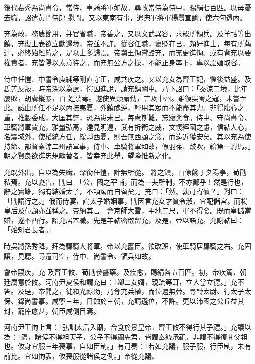 \begin{pinyinscope}
 後代裴秀為尚書令，常侍、車騎將軍如故。尋改常侍為侍中，賜絹七百匹。以母憂去職，詔遣黃門侍郎
 慰問。又以東南有事，遣典軍將軍楊囂宣諭，使六旬還內。



 充為政，務農節用，并官省職，帝善之，又以文武異容，求罷所領兵。及羊祜等出鎮，充復上表欲立勳邊境，帝並不許。從容任職，褒貶在已，頗好進士，每有所薦達，必終始經緯之，是以士多歸焉。帝舅王恂嘗毀充，而充更進恂。或有背充以要權貴者，充皆陽以素意待之。而充無公方之操，不能正身率下，專以諂媚取容。



 侍中任愷、中書令庾純等剛直守正，咸共疾之。又以充女為齊王妃，懼後益盛。及氐羌反叛，時帝深以為慮，愷因進說，請充鎮關中。乃下詔曰：「秦涼二境，比年屢敗，胡虜縱暴，百
 姓荼毒。遂使異類扇動，害及中州。雖復吳蜀之寇，未嘗至此。誠由所任不足以內撫夷夏，外鎮醜逆，輕用其眾而不能盡其力。非得腹心之重，推轂委成，大匡其弊，恐為患未已。每慮斯難，忘寢與食。侍中、守尚書令、車騎將軍賈充，雅量弘高，達見明遠，武有折衝之威，文懷經國之慮，信結人心，名震域外。使權統方任，綏靜西夏，則吾無西顧之念，而遠近獲安矣。其以充為使持節、都督秦涼二州諸軍事，侍中、車騎將軍如故，假羽葆、鼓吹，給第一駙馬。」朝之賢良欲進忠規獻替者，皆幸充此舉，望隆惟新之化。



 充既外出，自以為失職，深銜任愷，計無所從。
 將之鎮，百僚餞于夕陽亭，荀勖私焉。充以憂告，勖曰：「公，國之宰輔，而為一夫所制，不亦鄙乎！然是行也，辭之實難，獨有結婚太子，不頓駕而自留矣。」充曰：「然。孰可寄懷？」對曰：「勖請行之。」俄而侍宴，論太子婚姻事，勖因言充女才質令淑，宜配儲宮。而楊皇后及荀顗亦並稱之。帝納其言。會京師大雪，平地二尺，軍不得發。既而皇儲當婚，遂不西行。詔充居本職。先是羊祜密啟留充，及是，帝以語充。充謝祜曰：「始知君長者。」



 時吳將孫秀降，拜為驃騎大將軍。帝以充舊臣。欲改班，使車騎居驃騎之右。充固讓，見聽。尋遷司空，侍中、尚書令、領兵如故。



 會帝寢疾，充
 及齊王攸、荀勖參醫藥。及疾愈，賜絹各五百匹。初，帝疾篤，朝廷屬意於攸。河南尹夏侯和謂充曰：「卿二女婿，親疏等耳，立人當立德。」充不答。及是，帝聞之，徙和光祿勛，乃奪充兵權，而位遇無替。尋轉太尉、行太子太保、錄尚書事。咸寧三年，日蝕於三朝，充請遜位，不許。更以沛國之公丘益其封，寵倖愈甚，朝臣咸側目焉。



 河南尹王恂上言：「弘訓太后入廟，合食於景皇帝，齊王攸不得行其子禮。」充議以為：「禮，諸侯不得祖天子，公子不得禰先君，皆謂奉統承祀，非謂不得復其父祖也。攸身宜服三年喪事，自如臣制。」有司奏：「若如充議，服子服，行臣制，未有
 前比。宜如恂表，攸喪服從諸侯之例。」帝從充議。




\end{pinyinscope}
